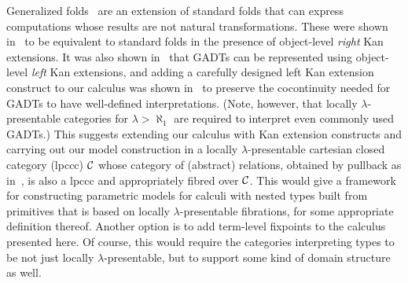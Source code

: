 \documentclass[runningheads]{llncs}
\newcommand{\set}{\mathsf{Set}}
\begin{document}
Generalized folds~\cite{bp99} are an extension of standard folds that
can express computations whose results are not natural
transformations. These were shown in~\cite{jg10} to be equivalent to
standard folds in the presence of object-level {\em right} Kan
extensions.
It was also shown in~\cite{jg08} that GADTs can be represented using
object-level {\em left} Kan extensions, and
%
%
adding a carefully designed left Kan extension construct to our
calculus was shown in~\cite{jp19} to preserve the cocontinuity needed
for GADTs to have well-defined interpretations. (Note, however, that
locally $\lambda$-presentable categories for $\lambda > \aleph_1$ are
required to interpret even commonly used GADTs.) This suggests
extending our calculus with Kan extension constructs and
carrying out our model construction in a locally $\lambda$-presentable
cartesian closed category (lpccc) $\cal C$ whose category of
(abstract) relations, obtained by pullback as in~\cite{jac99},
is also a lpccc and appropriately fibred over $\cal C$.  This would
give a framework for constructing parametric models for calculi
with nested types built from primitives that is based on locally
$\lambda$-presentable fibrations, for some appropriate definition
thereof.  Another option is to add term-level fixpoints
to the calculus presented here. Of course, this would require the
categories interpreting types to be not just locally
$\lambda$-presentable, but to support some kind of domain structure as
well.

\pagebreak

\noindent

\end{document}
